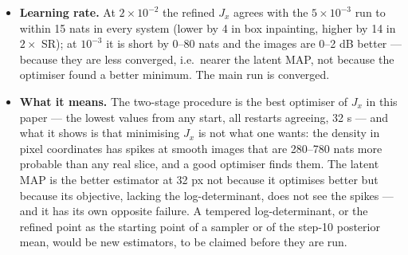 \documentclass[11pt]{article}
\begin{document}
\begin{itemize}
        $\le 0.02$ for the four single-basin systems; in CT two of the three
        pixel-only restarts fail outright ($J_x = -1453$ and $+1626$, data
        terms 773 and 2313 against a noise level of 273, $\max|x|$ 1.9) and
        the third reaches $-3331$ at 22.6 dB against $-3500$ and 26.2 dB.
        The traces (Figure~\ref{fig:step15curves32}) show the pixel-only
        runs still descending in box inpainting and CT when the learning
        rate reaches zero: they are limited by the schedule, the two-stage
        runs are converged by step 400. The ordering by image quality is
        therefore latent MAP $\ge$ latent-then-pixel $>$ pixel-only in five
        systems, with random inpainting the exception where the middle one
        wins.
  \item \textbf{Learning rate.} At $2 \times 10^{-2}$ the refined $J_x$
        agrees with the $5 \times 10^{-3}$ run to within 15 nats in every
        system (lower by 4 in box inpainting, higher by 14 in $2\times$ SR);
        at $10^{-3}$ it is short by 0--80 nats and the images are 0--2 dB
        better --- because they are less converged, i.e.\ nearer the latent
        MAP, not because the optimiser found a better minimum. The main
        run is converged.
  \item \textbf{What it means.} The two-stage procedure is the best
        optimiser of $J_x$ in this paper --- the lowest values from any
        start, all restarts agreeing, 32 s --- and what it shows is that
        minimising $J_x$ is not what one wants: the density in pixel
        coordinates has spikes at smooth images that are 280--780 nats
        more probable than any real slice, and a good optimiser finds them.
        The latent MAP is the better estimator at 32 px not because it
        optimises better but because its objective, lacking the
        log-determinant, does not see the spikes --- and it has its own
        opposite failure. A tempered log-determinant, or the refined point
        as the starting point of a sampler or of the step-10 posterior
        mean, would be new estimators, to be claimed before they are run.
\end{itemize}
\end{document}
